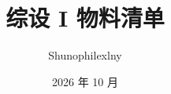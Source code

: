 

\usepackage{amsmath}
\usepackage{amssymb}
\usepackage{graphicx}
\usepackage{float}
\usepackage{array}
\usepackage{booktabs}
\usepackage{tabularx}
\usepackage{ragged2e}
\usepackage{enumitem}
\usepackage{xcolor}
\usepackage{hyperref}

\usepackage{fancyhdr}
\pagestyle{fancy}
\fancyhf{}
\fancyfoot[C]{\small\thepage}
\renewcommand{\headrulewidth}{0.4pt}
\fancypagestyle{plain}{\fancyhf{}\fancyfoot[C]{\small\thepage}\renewcommand{\headrulewidth}{0pt}}

\usepackage[most]{tcolorbox}

\usepackage{fontspec}
\usepackage[UTF8,scheme=chinese,fontset=fandol]{ctex}

\usepackage[a4paper,top=2.5cm,bottom=2.5cm,left=2.4cm,right=2.4cm,headheight=15pt]{geometry}


\title{\bfseries 综设 I 物料清单}
\author{Shunophilexlny}
\date{2026 年 10 月}
